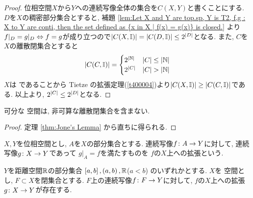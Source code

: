 \documentclass[uplatex, dvipdfmx, a4paper, 12pt, class=jsbook, crop=false]{standalone}
\begin{document}
\begin{proof}
	位相空間$ X $から$ Y $への連続写像全体の集合を$ C(X, Y) $と書くことにする. $ D $を$ X $の稠密部分集合とすると, 補題 \ref{lem:Let X and Y are top.sp, Y is T2, f,g : X to Y are conti, then the set defined as {x in X | f(x) = g(x)} is closed.} より$ f|_D = g|_D  \Leftrightarrow f =g $が成り立つので$ \left|C(X, \mathbb{I})\right| = \left|C(D, \mathbb{I})\right| \leq 2^{\left|D\right|} $となる. また, $ C $を$ X $の離散閉集合とすると
	$$ \left|C(C, \mathbb{I})\right| =\begin{cases}
	2^{\left|\mathbb{N}\right|} & \left|C\right| \leq \left|\mathbb{N}\right|\\
	2^{\left|C\right|} & \left|C\right| > \left|\mathbb{N}\right|
	\end{cases} $$
	$ X $は  であることから Tietze の拡張定理(\cref{t400004})より$ \left|C(X, \mathbb{I})\right| \geq \left|C(C, \mathbb{I})\right| $である. 以上より, $ 2^{\left|C\right|} \leq 2^{\left|D\right|} $となる.
\end{proof}

\begin{corollary}
	\label{coro:Corollary of Jone's Lamma}
	可分な  空間は, 非可算な離散閉集合を含まない.
\end{corollary}

\begin{proof}
	定理 \ref{thm:Jone's Lemma} から直ちに得られる.
\end{proof}

\begin{definition}
	\( X, Y \)を位相空間とし, \( A \)を\( X \)の部分集合とする.
	連続写像\( f\colon A\to Y \)に対して,
	連続写像\( g\colon X\to Y \)であって
	\( g|_A = f \)を満たすものを
	\( f \)の\( X \)上への拡張という.
\end{definition}

\begin{theorem}
	\label{t400004}
	\( Y \)を距離空間\( \mathbb{R} \)の部分集合
	\( \left[ a , b \right], \left( a , b \right), \mathbb{R} \)(\( a < b \))
	のいずれかとする.
	\( X \)を  空間とし, \( F \subset X \)を閉集合とする.
	\( F \)上の連続写像\( f\colon F\to Y \)に対して,
	\( f \)の\( X \)上への拡張\( g\colon X\to Y \)が存在する.
\end{theorem}
\end{document}
